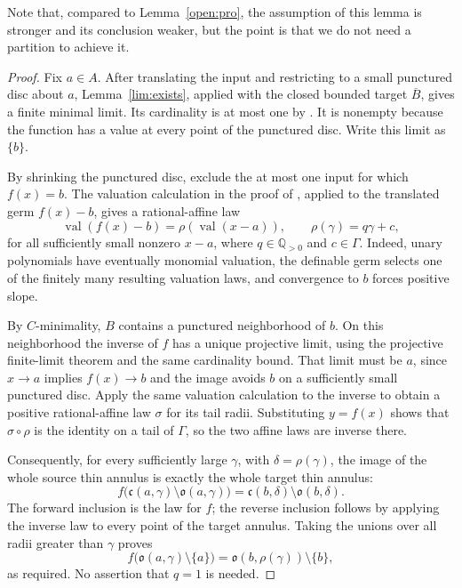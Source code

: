 \documentclass[12pt]{amsart}
\theoremstyle{plain}
\theoremstyle{definition}
\theoremstyle{remark}
\numberwithin{equation}{section}
\theoremstyle{plain}
\newcommand{\gc}{\mathfrak{c}}
\newcommand{\go}{\mathfrak{o}}
\newcommand{\0}{\emptyset}
\DeclareMathOperator{\vv}{val}
\begin{document}
Note that, compared to Lemma~\ref{open:pro}, the assumption of this lemma is stronger and its conclusion weaker, but the point is that we do not need a partition to achieve it.

\begin{proof}
Fix $a\in A$. After translating the input and restricting to a small punctured disc about $a$, Lemma~\ref{lim:exists}, applied with the closed bounded target $\overline B$, gives a finite minimal limit. Its cardinality is at most one by \cite[Lemma~9.4]{Yin:special:trans}. It is nonempty because the function has a value at every point of the punctured disc. Write this limit as $\{b\}$.

By shrinking the punctured disc, exclude the at most one input for which $f(x)=b$. The valuation calculation in the proof of \cite[Lemma~8.3]{Yin:special:trans}, applied to the translated germ $f(x)-b$, gives a rational-affine law
\[
\vv(f(x)-b)=\rho(\vv(x-a)),\qquad \rho(\gamma)=q\gamma+c,
\]
for all sufficiently small nonzero $x-a$, where $q\in\mathbb Q_{>0}$ and $c\in\Gamma$. Indeed, unary polynomials have eventually monomial valuation, the definable germ selects one of the finitely many resulting valuation laws, and convergence to $b$ forces positive slope.

By $C$-minimality, $B$ contains a punctured neighborhood of $b$. On this neighborhood the inverse of $f$ has a unique projective limit, using the projective finite-limit theorem and the same cardinality bound. That limit must be $a$, since $x\to a$ implies $f(x)\to b$ and the image avoids $b$ on a sufficiently small punctured disc. Apply the same valuation calculation to the inverse to obtain a positive rational-affine law $\sigma$ for its tail radii. Substituting $y=f(x)$ shows that $\sigma\circ\rho$ is the identity on a tail of $\Gamma$, so the two affine laws are inverse there.

Consequently, for every sufficiently large $\gamma$, with $\delta=\rho(\gamma)$, the image of the whole source thin annulus is exactly the whole target thin annulus:
\[
f\bigl(\gc(a,\gamma)\setminus\go(a,\gamma)\bigr)
 =\gc(b,\delta)\setminus\go(b,\delta).
\]
The forward inclusion is the law for $f$; the reverse inclusion follows by applying the inverse law to every point of the target annulus. Taking the unions over all radii greater than $\gamma$ proves
\[
f\bigl(\go(a,\gamma)\setminus\{a\}\bigr)
 =\go(b,\rho(\gamma))\setminus\{b\},
\]
as required. No assertion that $q=1$ is needed.
\end{proof}
\end{document}
